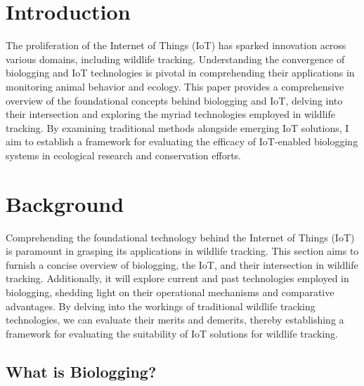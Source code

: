 \documentclass[sigplan,screen,nonacm]{acmart}
\begin{document}
\doclicenseThis



\maketitle

\section{Introduction}
\label{sec:introduction}

The proliferation of the Internet of Things (IoT) has sparked innovation across various domains, including 
wildlife tracking. Understanding the convergence of biologging and IoT technologies is pivotal in comprehending 
their applications in monitoring animal behavior and ecology. This paper provides a comprehensive overview of 
the foundational concepts behind biologging and IoT, delving into their intersection and exploring the myriad 
technologies employed in wildlife tracking. By examining traditional methods alongside emerging IoT solutions, 
I aim to establish a framework for evaluating the efficacy of IoT-enabled biologging systems in ecological 
research and conservation efforts.

\section{Background}
\label{sec:Background}

Comprehending the foundational technology behind the Internet of Things (IoT)
is paramount in grasping its applications in wildlife tracking. This section
aims to furnish a concise overview of biologging, the IoT, and their
intersection in wildlife tracking. Additionally, it will explore current and past
technologies employed in biologging, shedding light on their operational
mechanisms and comparative advantages. By delving into the workings of
traditional wildlife tracking technologies, we can evaluate their merits and
demerits, thereby establishing a framework for evaluating the suitability of
IoT solutions for wildlife tracking.

\subsection{What is Biologging?}
\label{subsec:What is Biologging}
\end{document}
